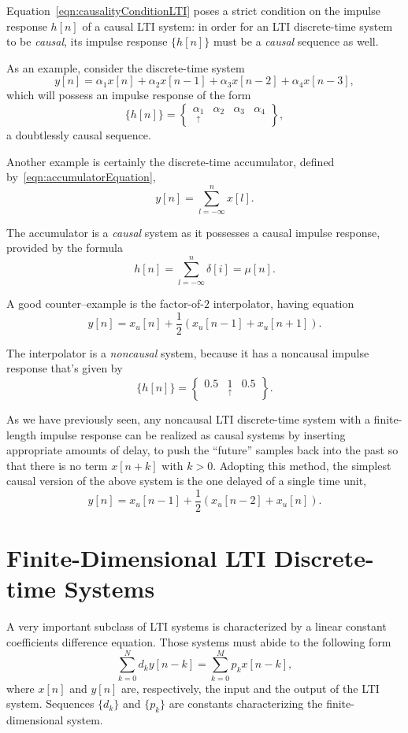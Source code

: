 \documentclass[\documentfontsize, twocolumn]{\classname}
\begin{document}
Equation~\ref{eqn:causalityConditionLTI} poses a strict condition on the impulse response $h[n]$ of a causal LTI system: in order for an LTI discrete-time system to be \emph{causal}, its impulse response $\{h[n]\}$ must be a \emph{causal} sequence as well.

As an example, consider the discrete-time system
\[
    y[n] = \alpha_1 x[n] + \alpha_2 x[n-1] + \alpha_3 x[n-2] + \alpha_4 x[n-3],
\]
which will possess an impulse response of the form
\[
    \{h[n]\} = \begin{Bmatrix}\underset{\uparrow}{\alpha_1} & \alpha_2 & \alpha_3 & \alpha_4\end{Bmatrix},
\]
a doubtlessly causal sequence.

Another example is certainly the discrete-time accumulator, defined by~\ref{eqn:accumulatorEquation},
\[
    y[n] = \sum_{l=-\infty}^{n} x[l].
\]

The accumulator is a \emph{causal} system as it possesses a causal impulse response, provided by the formula
\[
    h[n] = \sum_{l=-\infty}^{n} \delta[i] =\mu[n].
\]

A good counter--example is the factor-of-$2$ interpolator, having equation
\[
    y[n] = x_u[n] + \frac 1 2(x_u[n-1] + x_u[n+1]).
\]

The interpolator is a \emph{noncausal} system, because it has a noncausal impulse response that's given by
\[
    \{h[n]\} = \begin{Bmatrix} 0.5 & \underset{\uparrow}{1} & 0.5\end{Bmatrix}.
\]

As we have previously seen, any noncausal LTI discrete-time system with a finite-length impulse response can be realized as causal systems by inserting appropriate amounts of delay, to push the ``future'' samples back into the past so that there is no term $x[n+k]$ with $k>0$. Adopting this method, the simplest causal version of the above system is the one delayed of a single time unit,
\[
    y[n] = x_u[n-1] + \frac 1 2(x_u[n-2] + x_u[n]).
\]

\section{Finite-Dimensional LTI Discrete-time Systems}
A very important subclass of LTI systems is characterized by a linear constant coefficients difference equation. Those systems must abide to the following form
\begin{equation}\label{eqn:finiteDimensionalLtiSystems}
    \sum_{k=0}^N d_k y[n-k] = \sum_{k=0}^M p_k x[n-k],
\end{equation}
where $x[n]$ and $y[n]$ are, respectively, the input and the output of the LTI system. Sequences $\{d_k\}$ and $\{p_k\}$ are constants characterizing the finite-dimensional system.
\end{document}
